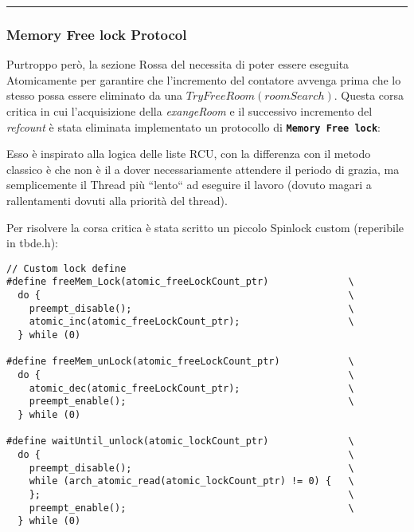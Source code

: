 \rule{\textwidth}{1pt}
\subsubsection{Memory Free lock Protocol}\label{memFreeLockProt}

Purtroppo però, la sezione {\color{red} Rossa} del  necessita di poter essere
eseguita Atomicamente per garantire che l'incremento del contatore avvenga prima che lo stesso possa essere eliminato
da una {\color{blue}$TryFreeRoom(roomSearch)$}. Questa corsa critica in cui l'acquisizione della \textit{exangeRoom} e
il successivo incremento del \textit{refcount} è stata eliminata implementato un protocollo di \texttt{\textbf{Memory
Free lock}}:

Esso è inspirato alla logica delle liste RCU, con la differenza con il metodo classico è che non è il \Writer
a dover necessariamente attendere il periodo di grazia, ma semplicemente il Thread più ``lento`` ad eseguire il lavoro
(dovuto magari a rallentamenti dovuti alla priorità del thread).

Per risolvere la corsa critica è stata scritto un piccolo Spinlock custom (reperibile in tbde.h):


\begin{indentPar}{2.5cm}
\begin{small}\begin{verbatim}
// Custom lock define
#define freeMem_Lock(atomic_freeLockCount_ptr)              \
  do {                                                      \
    preempt_disable();                                      \
    atomic_inc(atomic_freeLockCount_ptr);                   \
  } while (0)

#define freeMem_unLock(atomic_freeLockCount_ptr)            \
  do {                                                      \
    atomic_dec(atomic_freeLockCount_ptr);                   \
    preempt_enable();                                       \
  } while (0)

#define waitUntil_unlock(atomic_lockCount_ptr)              \
  do {                                                      \
    preempt_disable();                                      \
    while (arch_atomic_read(atomic_lockCount_ptr) != 0) {   \
    };                                                      \
    preempt_enable();                                       \
  } while (0)
\end{verbatim}
\end{small}
\end{indentPar}


